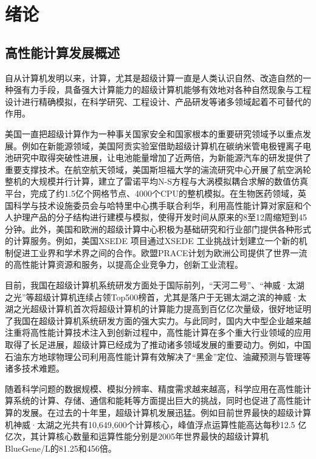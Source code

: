 \chapter{绪论}

\section{高性能计算发展概述}

自从计算机发明以来，计算，尤其是超级计算一直是人类认识自然、改造自然的一种强有力手段，具备强大计算能力的超级计算机能够有效地对各种自然现象与工程设计进行精确模拟，在科学研究、工程设计、产品研发等诸多领域起着不可替代的作用。

美国一直把超级计算作为一种事关国家安全和国家根本的重要研究领域予以重点发展。例如在新能源领域，美国阿贡实验室借助超级计算机在碳纳米管电极锂离子电池研究中取得突破性进展，让电池能量增加了近两倍，为新能源汽车的研发提供了重要支撑技术\cite{xiong2012self}。在航空航天领域，美国斯坦福大学的湍流研究中心开展了航空涡轮整机的大规模并行计算，建立了雷诺平均N-S方程与大涡模拟耦合求解的数值仿真平台，完成了约1.5亿个网格节点、4000个CPU的整机模拟\cite{reynolds2003aircraft}。在生物医药领域，英国科学与技术设施委员会与哈特里中心携手联合利华，利用高性能计算对家庭和个人护理产品的分子结构进行建模与模拟，使得开发时间从原来的8至12周缩短到45分钟\cite{Unilever}。此外，美国和欧洲的超级计算中心积极为基础研究和行业部门提供各种形式的计算服务。例如，美国XSEDE 项目通过XSEDE 工业挑战计划建立一个新的机制促进工业界和学术界之间的合作\cite{Unilever}。欧盟PRACE计划为欧洲公司提供了世界一流的高性能计算资源和服务\cite{PRACE}，以提高企业竞争力，创新工业流程。

目前，我国在超级计算机系统研发方面处于国际前列，“天河二号”\cite{tianhe-2}、“神威·太湖之光”\cite{fu2016sunway}等超级计算机连续占领Top500榜首，尤其是落户于无锡太湖之滨的神威·太湖之光超级计算机首次将超级计算机的计算能力提高到百亿亿次量级\cite{fu2016sunway}，很好地证明了我国在超级计算机系统研发方面的强大实力。与此同时，国内大中型企业越来越注重将高性能计算技术注入到创新过程中，高性能计算在多个重大行业领域的应用取得了长足进展，超级计算已经成为了推动诸多领域发展的重要动力。例如，中国石油东方地球物理公司利用高性能计算有效解决了“黑金”定位、油藏预测与管理等诸多技术难题\cite{luo2007hpc}。

随着科学问题的数据规模、模拟分辨率、精度需求越来越高，科学应用在高性能计算系统的计算、存储、通信和能耗等方面提出巨大的挑战，同时也促进了高性能计算的发展。在过去的十年里，超级计算机发展迅猛。例如目前世界最快的超级计算机神威·太湖之光共有10,649,600个计算核心，峰值浮点运算性能高达每秒12.5 亿亿次，其计算核心数量和运算性能分别是2005年世界最快的超级计算机BlueGene/L的81.25和456倍\cite{top5002015}。

